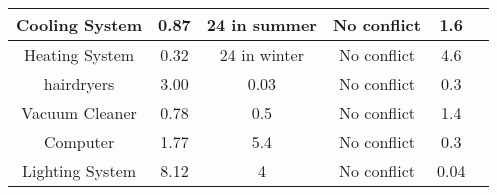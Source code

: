 \documentclass[12pt]{article}
\begin{document}
\begin{center}
\begin{tabular}{|c | c |c | c |c  |c|}
        Cooling System  & 0.87                        & 24 in summer             & No conflict             & 1.6   \\ \hline
        Heating System  & 0.32                        & 24 in winter             & No conflict             & 4.6   \\ \hline
        hairdryers      & 3.00                        & 0.03                     & No conflict             & 0.3   \\ \hline
        Vacuum Cleaner  & 0.78                        & 0.5                      & No conflict             & 1.4   \\ \hline
        Computer        & 1.77                        & 5.4                      & No conflict             & 0.3   \\\hline
        Lighting System & 8.12                        & 4                        & No conflict             & 0.04  \\ \hline
    \end{tabular}
\end{center}
\end{document}
